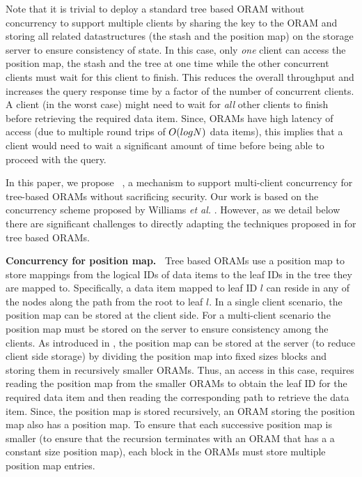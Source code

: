   Note that it is trivial to deploy a standard tree based ORAM without 
  concurrency to support multiple clients by sharing the key to the ORAM 
  and storing all related datastructures (the stash and the position map) on the 
  storage server to ensure consistency of state. 
  In this case, only {\em one} client can access the position map, the stash 
  and the tree at one time while the other concurrent clients 
  must wait for this client to finish. This reduces the overall throughput and increases the 
  query response time by a factor of the number of concurrent clients. A client (in the worst case) 
  might need to wait for {\em all} other clients to finish before retrieving the required data item. 
  Since, ORAMs have high latency of access (due to multiple round trips of $O(logN)$ data items), 
  this implies that a client would need to wait a significant amount of time before being able to proceed 
  with the query. 

  In this paper, we propose \sysname~, a mechanism to support multi-client concurrency for tree-based ORAMs 
  without sacrificing security. Our work is based on the concurrency scheme proposed by 
  Williams {\em et al.} \cite{privatefs}. However, as we detail below there are significant challenges to directly 
  adapting the techniques proposed in \cite{privatefs} for tree based ORAMs. 

  {\bf Concurrency for position map.~}
  Tree based ORAMs use a position map to store mappings from the logical IDs of data items to the leaf IDs in the tree they 
  are mapped to. Specifically, a data item mapped to leaf ID $l$ can reside in any of the nodes along the 
  path from the root to leaf $l$. In a single client scenario, the position map can be stored at the client side. For a 
  multi-client scenario the position map must be stored on the server to ensure consistency among the clients. 
  As introduced in \cite{binarytreeoram}, the position map can be stored at the server (to reduce client side storage) 
  by dividing the position map into fixed sizes blocks and storing them in recursively smaller ORAMs. 
  Thus, an access in this case, requires reading the position map from the smaller ORAMs to obtain 
  the leaf ID for the required data item and then reading the corresponding path to retrieve the data item. 
  Since, the position map is 
  stored recursively, an ORAM storing the position map also has a position map. To ensure that each successive position map is smaller 
  (to ensure that the recursion terminates with an ORAM that has a 
  a constant size position map), each block in the ORAMs must store multiple position map entries. 
  
